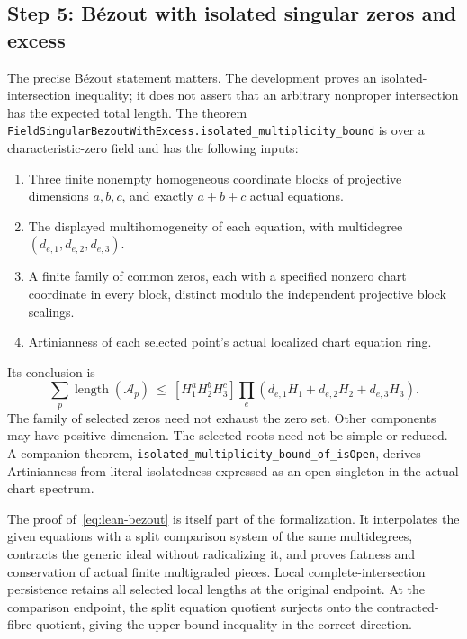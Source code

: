 \subsection{Step 5: B\'ezout with isolated singular zeros and excess}
\label{app:lean-bezout}

The precise B\'ezout statement matters.  The development proves an
isolated-intersection inequality; it does not assert that an arbitrary
nonproper intersection has the expected total length.  The theorem
\nolinkurl{FieldSingularBezoutWithExcess.isolated_multiplicity_bound}
is over a characteristic-zero field and has the following inputs:
\begin{enumerate}[leftmargin=*]
\item Three finite nonempty homogeneous coordinate blocks of projective
dimensions $a,b,c$, and exactly $a+b+c$ actual equations.
\item The displayed multihomogeneity of each equation, with multidegree
$(d_{e,1},d_{e,2},d_{e,3})$.
\item A finite family of common zeros, each with a specified nonzero chart
coordinate in every block, distinct modulo the independent projective
block scalings.
\item Artinianness of each selected point's actual localized chart
equation ring.
\end{enumerate}
Its conclusion is
\begin{equation}
 \label{eq:lean-bezout}
 \sum_p\operatorname{length}(\mathcal A_p)
 \ \leq\
 [H_1^aH_2^bH_3^c]
 \prod_e(d_{e,1}H_1+d_{e,2}H_2+d_{e,3}H_3).
\end{equation}
The family of selected zeros need not exhaust the zero set.  Other
components may have positive dimension.  The selected roots need not be
simple or reduced.  A companion theorem,
\nolinkurl{isolated_multiplicity_bound_of_isOpen}, derives Artinianness
from literal isolatedness expressed as an open singleton in the actual
chart spectrum.

The proof of~\eqref{eq:lean-bezout} is itself part of the formalization.
It interpolates the given equations with a split comparison system of the
same multidegrees, contracts the generic ideal without radicalizing it,
and proves flatness and conservation of actual finite multigraded pieces.
Local complete-intersection persistence retains all selected local
lengths at the original endpoint.  At the comparison endpoint, the split
equation quotient surjects onto the contracted-fibre quotient, giving the
upper-bound inequality in the correct direction.

